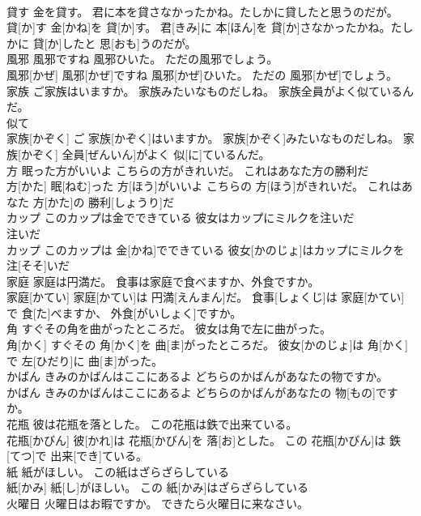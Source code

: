 \documentclass[8pt]{extreport}
\begin{document}
\begin{CJK}{UTF8}{min}
\\	貸す 金を貸す。 君に本を貸さなかったかね。たしかに貸したと思うのだが。	
\\	貸[か]す 金[かね]を 貸[か]す。 君[きみ]に 本[ほん]を 貸[か]さなかったかね。たしかに 貸[か]したと 思[おも]うのだが。
\\	風邪 風邪ですね 風邪ひいた。 ただの風邪でしょう。	
\\	風邪[かぜ] 風邪[かぜ]ですね 風邪[かぜ]ひいた。 ただの 風邪[かぜ]でしょう。
\\	家族 ご家族はいますか。 家族みたいなものだしね。 家族全員がよく似ているんだ。	
\\	似て 
\\	家族[かぞく] ご 家族[かぞく]はいますか。 家族[かぞく]みたいなものだしね。 家族[かぞく] 全員[ぜんいん]がよく 似[に]ているんだ。
\\	方 眠った方がいいよ こちらの方がきれいだ。 これはあなた方の勝利だ	
\\	方[かた] 眠[ねむ]った 方[ほう]がいいよ こちらの 方[ほう]がきれいだ。 これはあなた 方[かた]の 勝利[しょうり]だ
\\	カップ このカップは金でできている 彼女はカップにミルクを注いだ	
\\	注いだ 
\\	カップ このカップは 金[かね]でできている 彼女[かのじょ]はカップにミルクを 注[そそ]いだ
\\	家庭 家庭は円満だ。 食事は家庭で食べますか、外食ですか。	
\\	家庭[かてい] 家庭[かてい]は 円満[えんまん]だ。 食事[しょくじ]は 家庭[かてい]で 食[た]べますか、 外食[がいしょく]ですか。
\\	角 すぐその角を曲がったところだ。 彼女は角で左に曲がった。	
\\	角[かく] すぐその 角[かく]を 曲[ま]がったところだ。 彼女[かのじょ]は 角[かく]で 左[ひだり]に 曲[ま]がった。
\\	かばん きみのかばんはここにあるよ どちらのかばんがあなたの物ですか。	
\\	かばん きみのかばんはここにあるよ どちらのかばんがあなたの 物[もの]ですか。
\\	花瓶 彼は花瓶を落とした。 この花瓶は鉄で出来ている。	
\\	花瓶[かびん] 彼[かれ]は 花瓶[かびん]を 落[お]とした。 この 花瓶[かびん]は 鉄[てつ]で 出来[でき]ている。
\\	紙 紙がほしい。 この紙はざらざらしている	
\\	紙[かみ] 紙[し]がほしい。 この 紙[かみ]はざらざらしている
\\	火曜日 火曜日はお暇ですか。 できたら火曜日に来なさい。	

\end{CJK}
\end{document}
